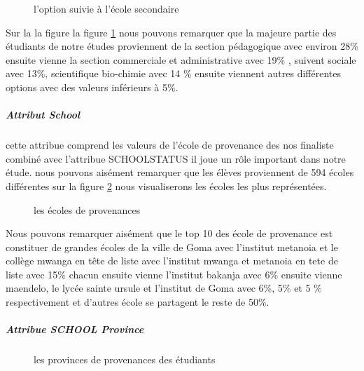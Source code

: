 \begin{figure}[!htbp]
	\centering
	\caption[Short caption]{l'option suivie à l'école secondaire }
	\label{fig:Option_right}
\end{figure}
Sur la la figure la figure \ref{fig:Option_right} nous pouvons remarquer que la majeure partie des
étudiants de notre études proviennent de la section pédagogique avec
environ 28\% ensuite vienne la section commerciale et administrative
avec 19\% , suivent sociale avec 13\%, scientifique bio-chimie avec 14
\% ensuite viennent autres différentes options avec des valeurs
inférieurs à 5\%.
\subparagraph{Attribut School}\label{attribut-school}
cette attribue comprend les valeurs de l'école de provenance des nos
finaliste combiné avec l'attribue SCHOOLSTATUS  il joue un rôle
important dans notre étude.
nous pouvons aisément remarquer que les élèves proviennent de 594 écoles
différentes sur la figure \ref{fig:SCHOOL} nous visualiserons les écoles
les plus représentées.
\begin{figure}[!htbp]
	\centering
	\caption[Short caption]{les écoles de provenances  }
	\label{fig:SCHOOL}
\end{figure}
Nous pouvons remarquer aisément que le top 10 des école de provenance
est constituer de grandes écoles de la ville de Goma avec l'institut
metanoia et le collège mwanga en tête de liste avec l'institut mwanga et
metanoia en tete de liste avec 15\% chacun ensuite vienne l'institut
bakanja avec 6\% ensuite vienne maendelo, le lycée sainte ursule et
l'institut de Goma avec 6\%, 5\% et 5 \% respectivement et d'autres
école se partagent le reste de 50\%.
\subparagraph{Attribue SCHOOL Province}
\begin{figure}[!htbp]
	\centering
	\caption[Short caption]{les provinces de provenances des étudiants   }
	\label{fig:SCHOOLProvince}
\end{figure}
